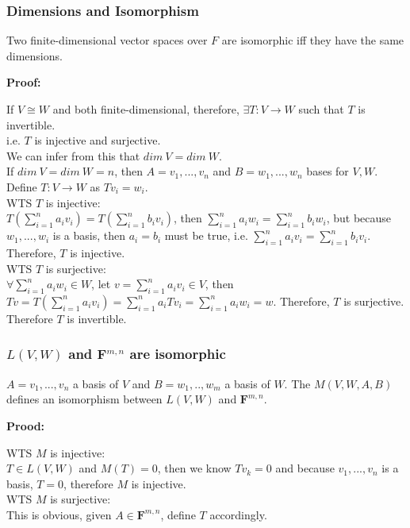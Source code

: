 \documentclass{article}
\begin{document}
\subsubsection{Dimensions and Isomorphism}
\begin{addmargin}[1em]{0em}
Two finite-dimensional vector spaces over $F$ are isomorphic iff they have the same dimensions.
\end{addmargin}
\textbf{Proof:}
\begin{addmargin}[1em]{0em}
If $V \cong W$ and both finite-dimensional, therefore, $\exists T:V \rightarrow W$ such that $T$ is invertible.\\
i.e. $T$ is injective and surjective.\\
We can infer from this that $dim\ V = dim\ W$.\\
If $dim\ V = dim\ W = n$, then $A = v_1, ..., v_n$ and $B = w_1, ..., w_n$ bases for $V, W$.\\
Define $T:V \rightarrow W$ as $Tv_i = w_i$.\\
WTS $T$ is injective:\\
$T(\sum_{i=1}^{n}a_iv_i) = T(\sum_{i=1}^{n}b_iv_i)$, then $\sum_{i=1}^{n}a_iw_i = \sum_{i=1}^{n}b_iw_i$, but because $w_1, ..., w_i$ is a basis, then $a_i = b_i$ must be true, i.e. $\sum_{i=1}^{n}a_iv_i = \sum_{i=1}^{n}b_iv_i$. Therefore, $T$ is injective.\\
WTS $T$ is surjective:\\
$\forall \sum_{i=1}^{n}a_iw_i \in W$, let $v = \sum_{i=1}^{n}a_iv_i \in V$, then $Tv = T(\sum_{i=1}^{n}a_iv_i) = \sum_{i=1}^{n}a_iTv_i = \sum_{i=1}^{n}a_iw_i = w$. Therefore, $T$ is surjective.\\
Therefore $T$ is invertible.
\end{addmargin}
\subsubsection{$L(V,W)$ and $\textbf{F}^{m,n}$ are isomorphic}
\begin{addmargin}[1em]{0em}
$A = v_1, ..., v_n$ a basis of $V$ and $B = w_1, .., w_m$ a basis of $W$. The $M(V, W, A, B)$ defines an isomorphism between $L(V, W)$ and $\textbf{F}^{m,n}$.
\end{addmargin}
\textbf{Prood:}
\begin{addmargin}[1em]{0em}
WTS $M$ is injective:\\
$T\in L(V,W)$ and $M(T) = 0$, then we know $Tv_k = 0$ and because $v_1, ..., v_n$ is a basis, $T = 0$, therefore $M$ is injective.\\
WTS $M$ is surjective:\\
This is obvious, given $A \in \textbf{F}^{m,n}$, define $T$ accordingly.
\end{addmargin}
\end{document}
